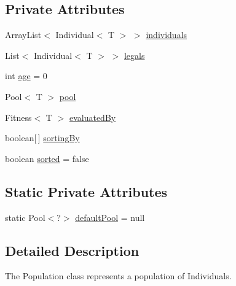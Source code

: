 \subsection*{Private Attributes}
\begin{DoxyCompactItemize}
\item 
Array\-List$<$ Individual$<$ T $>$ $>$ \hyperlink{classjenes_1_1population_1_1_population_3_01_t_01extends_01_chromosome_01_4_a3e44ded88c30a8dab6b35fadd986ef47}{individuals}
\item 
List$<$ Individual$<$ T $>$ $>$ \hyperlink{classjenes_1_1population_1_1_population_3_01_t_01extends_01_chromosome_01_4_ac33145aefb6ffe7d446b23deef546adf}{legals}
\item 
int \hyperlink{classjenes_1_1population_1_1_population_3_01_t_01extends_01_chromosome_01_4_a0f21ed32d1bb2e1d3f3663c86351a803}{age} = 0
\item 
Pool$<$ T $>$ \hyperlink{classjenes_1_1population_1_1_population_3_01_t_01extends_01_chromosome_01_4_a4923c4758a9688ce2c0dce823b79f729}{pool}
\item 
Fitness$<$ T $>$ \hyperlink{classjenes_1_1population_1_1_population_3_01_t_01extends_01_chromosome_01_4_a7c5c43b305c451095a366663cc061f9d}{evaluated\-By}
\item 
boolean\mbox{[}$\,$\mbox{]} \hyperlink{classjenes_1_1population_1_1_population_3_01_t_01extends_01_chromosome_01_4_a7e2494bc6b09d2ebb28206fb0a7ca172}{sorting\-By}
\item 
boolean \hyperlink{classjenes_1_1population_1_1_population_3_01_t_01extends_01_chromosome_01_4_a619b7d803a31dfd60ebacdf48e84c997}{sorted} = false
\end{DoxyCompactItemize}
\subsection*{Static Private Attributes}
\begin{DoxyCompactItemize}
\item 
static Pool$<$?$>$ \hyperlink{classjenes_1_1population_1_1_population_3_01_t_01extends_01_chromosome_01_4_a03e49f128c364d278832a0d989a11e6f}{default\-Pool} = null
\end{DoxyCompactItemize}


\subsection{Detailed Description}
The Population class represents a population of {\ttfamily Individual}s. 

